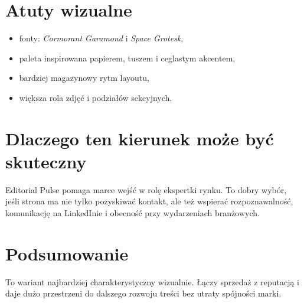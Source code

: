\documentclass[11pt,a4paper]{article}
\begin{document}
\section*{Atuty wizualne}
\begin{itemize}
  \item fonty: \textit{Cormorant Garamond} i \textit{Space Grotesk},
  \item paleta inspirowana papierem, tuszem i ceglastym akcentem,
  \item bardziej magazynowy rytm layoutu,
  \item większa rola zdjęć i podziałów sekcyjnych.
\end{itemize}

\section*{Dlaczego ten kierunek może być skuteczny}
Editorial Pulse pomaga marce wejść w rolę ekspertki rynku. To dobry wybór, jeśli strona ma nie tylko pozyskiwać kontakt, ale też wspierać rozpoznawalność, komunikację na LinkedInie i obecność przy wydarzeniach branżowych.

\section*{Podsumowanie}
To wariant najbardziej charakterystyczny wizualnie. Łączy sprzedaż z reputacją i daje dużo przestrzeni do dalszego rozwoju treści bez utraty spójności marki.
\end{document}
